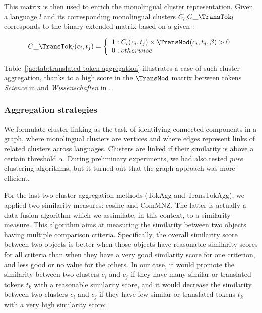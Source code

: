 \documentclass[output=paper]{langsci/langscibook}
\begin{document}
This matrix is then used to enrich the monolingual cluster
representation.  Given a language $l$ and its corresponding
monolingual clusters $C_{l}$,$C\_\TransTok_{l}$ corresponds to the
binary extended matrix based on a given :

\begin{equation}
C\_\TransTok_{l}(c_i,t_j) =
\left\{
  \begin{array}{lr}
    1 : C_{l}(c_i,t_j) \times \TransMod(c_i,t_j,\beta) > 0\\
    0 : otherwise
  \end{array}
\right.
\end{equation}

Table~\ref{jac:tab:translated token aggregation} illustrates a case of
such cluster aggregation, thanks to a high score in the $\TransMod$
matrix between tokens \textit{Science} in  and
\textit{Wissenschaften} in .

\subsubsection{Aggregation strategies}
\label{jac:aggregation clusters}

 
We formulate cluster linking as the task of identifying connected
components in a graph, where monolingual clusters are vertices and
where edges represent links of related clusters across
languages. Clusters are linked if their similarity is above a certain
threshold $\alpha$. During preliminary experiments, we had also tested
\emph{pure} clustering algorithms, but it turned out that the graph
approach was more efficient.

For the last two cluster aggregation methods (TokAgg and
TransTokAgg), we applied two similarity measures: cosine and
ComMNZ. The latter is actually a data fusion algorithm \citep{fox-94}
which we assimilate, in this context, to a similarity measure.  This
algorithm aims at measuring the similarity between two objects having
multiple comparison criteria. Specifically, the overall similarity
score between two objects is better when those objects have reasonable
similarity scores for all criteria than when they have a very good
similarity score for one criterion, and less good or no value for the
others.  In our case, it would promote the similarity between two
clusters $c_i$ and $c_j$ if they have many similar or translated
tokens $t_k$ with a reasonable similarity score, and it would decrease
the similarity between two clusters $c_i$ and $c_j$ if they have few
similar or translated tokens $t_k$ with a very high similarity score:
\end{document}
